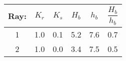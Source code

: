 \begin{tabular}{cccccc}
Ray: & $K_{r}$ & $K_{s}$ & $H_{b}$ & $h_{b}$ & $\dfrac{H_{b}}{h_{b}}$ \\
\hline
1 & 1.0 & 0.1 & 5.2 & 7.6 & 0.7 \\
2 & 1.0 & 0.0 & 3.4 & 7.5 & 0.5 \\
\hline
\end{tabular}
